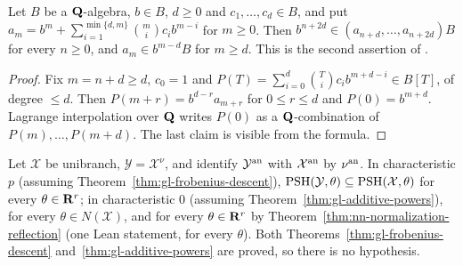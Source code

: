 \begin{lemma}\label{lem:gl-lagrange}
\leanok
Let $B$ be a $\mathbf{Q}$-algebra, $b\in B$, $d\ge0$ and $c_1,\dots,c_d\in B$, and put $a_m=b^m+\sum_{i=1}^{\min\{d,m\}}\binom mic_ib^{m-i}$ for $m\ge0$. Then
$b^{n+2d}\in(a_{n+d},\dots,a_{n+2d})B$ for every $n\ge0$, and $a_m\in b^{m-d}B$ for $m\ge d$. This is the second assertion of
\cite[Lemma~8.2]{FHX}.
\end{lemma}

\begin{proof}
Fix $m=n+d\ge d$, $c_0=1$ and $P(T)=\sum_{i=0}^d\binom Tic_ib^{m+d-i}\in B[T]$, of degree $\le d$. Then $P(m+r)=b^{d-r}a_{m+r}$ for $0\le r\le d$ and $P(0)=b^{m+d}$.
Lagrange interpolation over $\mathbf{Q}$ writes $P(0)$ as a $\mathbf{Q}$-combination of $P(m),\dots,P(m+d)$. The last claim is visible from the formula.
\end{proof}

\begin{theorem}\label{thm:gl-normalization-reflection}
\leanok
{}
Let $\mathcal X$ be unibranch, $\mathcal Y=\mathcal X^\nu$, and identify $\mathcal Y^{\mathrm{an}}$ with $\mathcal X^{\mathrm{an}}$ by $\nu^{\mathrm{an}}$. In characteristic $p$ (assuming
Theorem~\ref{thm:gl-frobenius-descent}), $\operatorname{PSH}(\mathcal Y,\theta)\subseteq\operatorname{PSH}(\mathcal X,\theta)$ for every $\theta\in\mathbf{R}^r$; in characteristic $0$ (assuming
Theorem~\ref{thm:gl-additive-powers}), for every $\theta\in N(\mathcal X)$, and for every $\theta\in\mathbf{R}^r$ by Theorem~\ref{thm:nn-normalization-reflection}
(one Lean statement, for every $\theta$). Both Theorems~\ref{thm:gl-frobenius-descent} and~\ref{thm:gl-additive-powers} are proved, so
there is no hypothesis.
\end{theorem}

